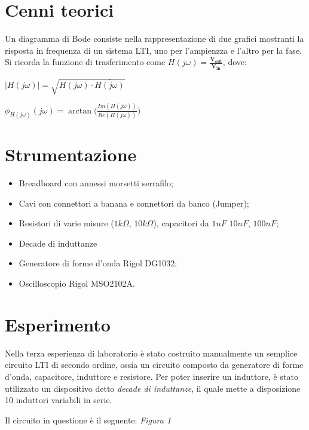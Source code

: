     \section{Cenni teorici}
    Un diagramma di Bode consiste nella rappresentazione di due grafici mostranti la risposta in frequenza di un sistema LTI, 
    uno per l'ampienzza e l'altro per la fase.
    Si ricorda la funzione di trasferimento come $H(j\omega) = \frac{\mathbf{V_{out}}}{\mathbf{V_{in}}}$, dove:\par 
    $\left\lvert H(j\omega) \right\rvert = \sqrt{H(j\omega) \cdot \overline{H(j\omega)}} $\par
    $\phi_{H(j\omega)}(j\omega) = \arctan \bigl(\frac{Im(H(j\omega))}{Re(H(j\omega))} \bigr)$ \par

    \section{Strumentazione}
    \begin{itemize}
        \item Breadboard con annessi morsetti serrafilo;
        \item Cavi con connettori a banana e connettori da banco (Jumper);
        \item Resistori di varie misure ($1k\Omega$, $10k\Omega$), capacitori da $1nF$ $10nF$, $100nF$;
        \item Decade di induttanze
        \item Generatore di forme d'onda Rigol DG1032;
        \item Oscilloscopio Rigol MSO2102A.
    \end{itemize}

    \newpage

    \section{Esperimento}
    Nella terza esperienza di laboratorio è stato costruito manualmente un semplice circuito LTI di secondo ordine, ossia
    un circuito composto da generatore di forme d'onda, capacitore, induttore e resistore. Per poter inserire un induttore, è stato utilizzato un dispositivo
    detto \textit{decade di induttanze}, il quale mette a disposizione 10 induttori variabili in serie. \par
    Il circuito in questione è il seguente: \textit{Figura 1}\par

